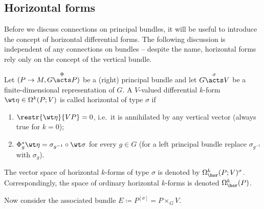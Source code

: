 \subsection{Horizontal forms}

Before we discuss connections on principal bundles, it will be useful to introduce the concept of horizontal differential forms. The following discussion is independent of any connections on bundles -- despite the name, horizontal forms rely only on the concept of the vertical bundle.

\begin{defn}
    Let $(P\to M,G\overset{\Phi}{\acts} P)$ be a (right) principal bundle and let $G\overset{\sigma}{\acts}V$ be a finite-dimensional representation of $G$. A $V$-valued differential $k$-form $\wt\eta\in\Omega^k(P;V)$ is called horizontal of type $\sigma$ if
    \begin{enumerate}
        \item $\restr{\wt\eta}{VP}=0$, i.e.\ it is annihilated by any vertical vector (always true for $k=0$);
        \item $\Phi_g^\ast \wt\eta=\sigma_{g^{-1}}\circ\wt\sigma$ for every $g\in G$ (for a left principal bundle replace $\sigma_{g^{-1}}$ with $\sigma_g$).
    \end{enumerate}
    The vector space of horizontal $k$-forms of type $\sigma$ is denoted by $\Omega^k_{\hor}(P;V)^\sigma$. Correspondingly, the space of ordinary horizontal $k$-forms is denoted $\Omega^k_{\hor}(P)$. 
\end{defn}

Now consider the associated bundle $E\coloneqq P^{[\sigma]}=P\times_G V$.

